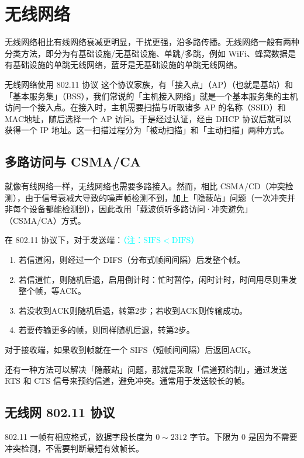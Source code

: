 \documentclass[UTF8]{ctexart}
\newcommand\Concept[1]{\textcolor{cyan!70!black}{#1}}
\begin{document}
\section{无线网络}
无线网络相比有线网络衰减更明显，干扰更强，沿多路传播。无线网络一般有两种分类方法，即分为有基础设施/无基础设施、单跳/多跳，例如 WiFi、蜂窝数据是有基础设施的单跳无线网络，蓝牙是无基础设施的单跳无线网络。

无线网络使用 \Concept{802.11 协议} 这个协议家族，有\Concept{「接入点」（AP）}（也就是基站）和\Concept{「基本服务集」（BSS）}，我们常说的「主机接入网络」就是一个基本服务集的主机访问一个接入点。在接入时，主机需要扫描与听取诸多 AP 的名称（SSID）和MAC地址，随后选择一个 AP 访问。于是经过认证，经由 DHCP 协议后就可以获得一个 IP 地址。这一扫描过程分为「被动扫描」和「主动扫描」两种方式。

\subsection{多路访问与 CSMA/CA}
就像有线网络一样，无线网络也需要多路接入。然而，相比 CSMA/CD（冲突检测），由于信号衰减大导致的噪声帧检测不到，加上「隐蔽站」问题（一次冲突并非每个设备都能检测到），因此改用\Concept{「载波侦听多路访问·冲突避免」（CSMA/CA）}方式。

在 802.11 协议下，对于发送端：\textcolor{cyan}{（注：$\mathrm{SIFS<DIFS}$）}
\begin{enumerate}[itemsep=0pt,parsep=0pt]
  \item 若信道闲，则经过一个 DIFS（分布式帧间间隔）后发整个帧。
  \item 若信道忙，则随机后退，启用倒计时：忙时暂停，闲时计时，时间用尽则重发整个帧，等ACK。
  \item 若没收到ACK则随机后退，转第2步；若收到ACK则传输成功。
  \item 若要传输更多的帧，则同样随机后退，转第2步。
\end{enumerate}
对于接收端，如果收到帧就在一个 SIFS（短帧间间隔）后返回ACK。

还有一种方法可以解决「隐蔽站」问题，那就是采取「信道预约制」，通过发送 RTS 和 CTS 信号来预约信道，避免冲突。通常用于发送较长的帧。

\subsection{无线网 802.11 协议}
802.11 一帧有相应格式，数据字段长度为 $0\sim 2312$ 字节。下限为 0 是因为不需要冲突检测，不需要判断最短有效帧长。
\end{document}
